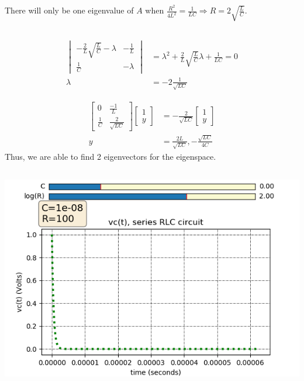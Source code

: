 \documentclass[]{article}
\begin{document}
\subsection{}

There will only be one eigenvalue of \(A\) when \(\frac{R^2}{4L^2} = \frac{1}{LC} \Rightarrow R = 2\sqrt{\frac{L}{C}}\).

\subsection{}

\begin{align}
	\begin{vmatrix}
	-\frac{2}{L} \sqrt{\frac{L}{C}} - \lambda & -\frac{1}{L} \\
	\frac{1}{C} & -\lambda
	\end{vmatrix} &= \lambda^2 + \frac{2}{L} \sqrt{\frac{L}{C}} \lambda + \frac{1}{LC} = 0 \\
	\lambda &= -2 \frac{1}{\sqrt{LC}}
\end{align}

\begin{align}
	\begin{bmatrix}
	0 & \frac{-1}{L} \\
	\frac{1}{C} & \frac{2}{\sqrt{LC}}
	\end{bmatrix}
	\begin{bmatrix}
	1 \\
	y
	\end{bmatrix}
	&=
	-\frac{2}{\sqrt{LC}} \begin{bmatrix}
	1 \\
	y
	\end{bmatrix} \\
	y &= \frac{2L}{\sqrt{LC}}, -\frac{\sqrt{LC}}{4C}
\end{align}
Thus, we are able to find 2 eigenvectors for the eigenspace.

\subsection{}

\begin{center}
	\includegraphics[width=0.7\linewidth]{critdamped}
\end{center}
\end{document}
